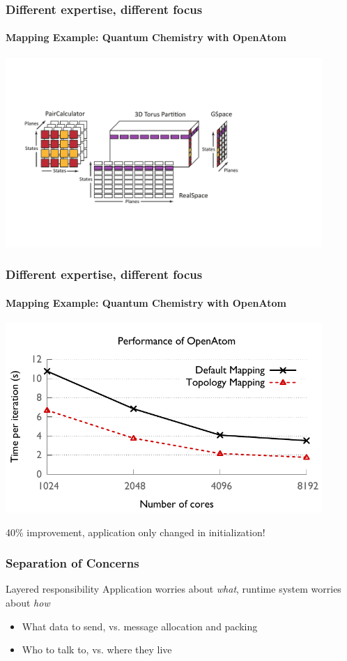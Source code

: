 \begin{frame}
\frametitle{Different expertise, different focus}
\framesubtitle{Mapping Example: Quantum Chemistry with {\sc OpenAtom}}
\includegraphics[width=0.9\textwidth]{../figures/openatom/mapping.pdf}
\end{frame}


\begin{frame}
\frametitle{Different expertise, different focus}
\framesubtitle{Mapping Example: Quantum Chemistry with {\sc OpenAtom}}
\includegraphics[width=0.9\textwidth]{../figures/openatom/map.pdf}
\begin{block}{40\% improvement, application only changed in initialization!}\end{block}
\end{frame}


\begin{frame}
\frametitle{Separation of Concerns}
\begin{block}{Layered responsibility}
Application worries about \emph{what}, runtime system worries about \emph{how}
\end{block}
\begin{itemize}
\item What data to send, vs. message allocation and packing
\item Who to talk to, vs. where they live
\end{itemize}
\end{frame}


